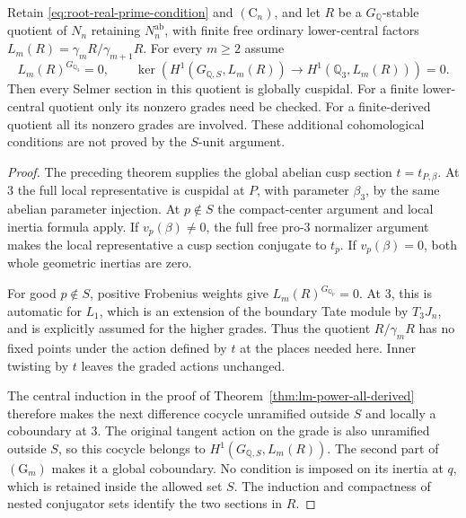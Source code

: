 \begin{proposition}
\label{prop:lm-real-mixed-higher-criterion}
Retain \eqref{eq:root-real-prime-condition} and $(\mathrm C_n)$,
and let $R$ be a
$G_{\mathbb Q}$-stable quotient of $N_n$
retaining $N_n^{\mathrm{ab}}$, with finite
free ordinary lower-central factors
$L_m(R)=\gamma_mR/\gamma_{m+1}R$.
For every $m\ge2$ assume
\[
 L_m(R)^{G_{\mathbb Q_3}}=0,\qquad
 \ker\!\left(
 H^1(G_{\mathbb Q,S},L_m(R))
 \longrightarrow H^1(\mathbb Q_3,L_m(R))
 \right)=0.
 \tag{$\mathrm G_m$}
\]
Then every Selmer section in this quotient
is globally cuspidal.  For a finite
lower-central quotient only its nonzero
grades need be checked.  For a finite-derived
quotient all its nonzero grades are involved.
These additional cohomological conditions
are not proved by the $S$-unit argument.
\end{proposition}
\begin{proof}
The preceding theorem supplies the global
abelian cusp section $t=t_{P,\beta}$.
At $3$ the full local representative is
cuspidal at $P$, with parameter $\beta_3$,
by the same abelian parameter injection.
At $p\notin S$ the compact-center argument
and local inertia formula apply.  If
$v_p(\beta)\ne0$, the full free pro-$3$
normalizer argument makes the local
representative a cusp section conjugate
to $t_p$.  If $v_p(\beta)=0$, both
whole geometric inertias are zero.

For good $p\notin S$, positive Frobenius
weights give $L_m(R)^{G_{\mathbb Q_p}}=0$.
At $3$, this is automatic for $L_1$,
which is an extension of the boundary
Tate module by $T_3J_n$, and is explicitly
assumed for the higher grades.
Thus the quotient $R/\gamma_mR$ has no
fixed points under the action defined
by $t$ at the places needed here.
Inner twisting by $t$ leaves the graded
actions unchanged.

The central induction in the proof of Theorem~\ref{thm:lm-power-all-derived} therefore
makes the next difference cocycle
unramified outside $S$ and locally
a coboundary at $3$.  The original
tangent action on the grade is also
unramified outside $S$, so this
cocycle belongs to
$H^1(G_{\mathbb Q,S},L_m(R))$.
The second part of $(\mathrm G_m)$
makes it a global coboundary.
No condition is imposed on its
inertia at $q$, which is retained
inside the allowed set $S$.
The induction and compactness of
nested conjugator sets identify
the two sections in $R$.
\end{proof}

